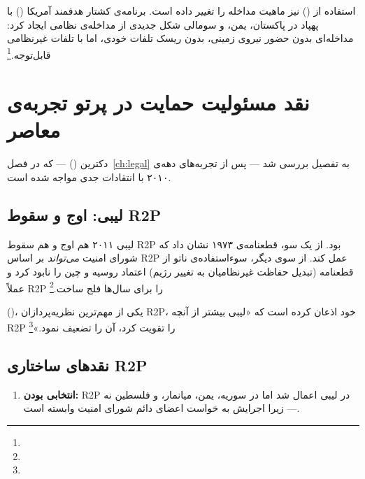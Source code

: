 {استفاده از  () نیز ماهیت مداخله را تغییر داده است. برنامه‌ی کشتار هدفمند آمریکا () با پهپاد در پاکستان، یمن، و سومالی شکل جدیدی از مداخله‌ی نظامی ایجاد کرد: مداخله‌ای بدون حضور نیروی زمینی، بدون ریسک تلفات خودی، اما با تلفات غیرنظامی قابل‌توجه.\footnote{}


\section{نقد مسئولیت حمایت در پرتو تجربه‌ی معاصر}
\label{sec:ch10-r2p-critique}

دکترین  () — که در فصل~\ref{ch:legal} به تفصیل بررسی شد — پس از تجربه‌های دهه‌ی ۲۰۱۰ با انتقادات جدی مواجه شده است.

\subsection{لیبی: اوج و سقوط R2P}
\label{subsec:ch10-r2p-libya}

لیبی ۲۰۱۱ هم اوج و هم سقوط R2P بود. از یک سو، قطعنامه‌ی ۱۹۷۳ نشان داد که شورای امنیت \textit{می‌تواند} بر اساس R2P عمل کند. از سوی دیگر، سوءاستفاده‌ی ناتو از قطعنامه (تبدیل حفاظت غیرنظامیان به تغییر رژیم) اعتماد روسیه و چین را نابود کرد و عملاً R2P را برای سال‌ها فلج ساخت.\footnote{}

 ()، یکی از مهم‌ترین نظریه‌پردازان R2P، خود اذعان کرده است که «لیبی بیشتر از آنچه R2P را تقویت کرد، آن را تضعیف نمود.»\footnote{}

\subsection{نقدهای ساختاری R2P}
\label{subsec:ch10-r2p-structural}

\begin{tcolorbox}[failbox, title={نقدهای بنیادین بر مسئولیت حمایت}]
\begin{enumerate}
\item \textbf{انتخابی بودن:} R2P در لیبی اعمال شد اما در سوریه، یمن، میانمار، و فلسطین نه — زیرا اجرایش به خواست اعضای دائم شورای امنیت وابسته است.


\end{enumerate}
\end{tcolorbox}}
